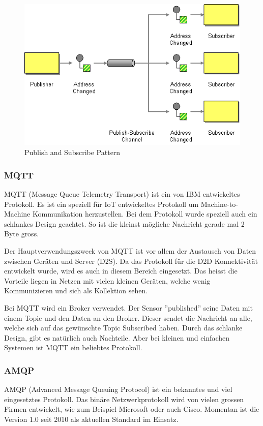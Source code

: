 \begin{figure}[H]
\centering
\includegraphics[scale=0.65]{../02_Analyse/images/publishsubscribe.png}
\caption{Publish and Subscribe Pattern\cite{PublishSubscribePattern}}
\end{figure}
\subsubsection{MQTT}
MQTT (Message Queue Telemetry Transport) ist ein von IBM entwickeltes Protokoll. Es ist ein speziell für IoT entwickeltes Protokoll um Machine-to-Machine Kommunikation herzustellen. Bei dem Protokoll wurde speziell auch ein schlankes Design geachtet. So ist die kleinst mögliche Nachricht gerade mal 2 Byte gross. 

Der Hauptverwendungszweck von MQTT ist vor allem der Austausch von Daten zwischen Geräten und Server (D2S).\cite{ProtPubSub} Da das Protokoll für die D2D Konnektivität entwickelt wurde, wird es auch in diesem Bereich eingesetzt. Das heisst die Vorteile liegen in Netzen mit vielen kleinen Geräten, welche wenig Kommunizieren und sich als Kollektion sehen.\cite{ProtPubSubReason}

Bei MQTT wird ein Broker verwendet. Der Sensor ''published'' seine Daten mit einem Topic und den Daten an den Broker. Dieser sendet die Nachricht an alle, welche sich auf das gewünschte Topic Subscribed haben. Durch das schlanke Design, gibt es natürlich auch Nachteile. Aber bei kleinen und einfachen Systemen ist MQTT ein beliebtes Protokoll.
\subsubsection{AMQP}
AMQP (Advanced Message Queuing Protocol) ist ein bekanntes und viel eingesetztes Protokoll. Das binäre Netzwerkprotokoll wird von vielen grossen Firmen\cite{ProtPubSubReason} entwickelt, wie zum Beispiel Microsoft oder auch Cisco. Momentan ist die Version 1.0 seit 2010 als aktuellen Standard im Einsatz.

